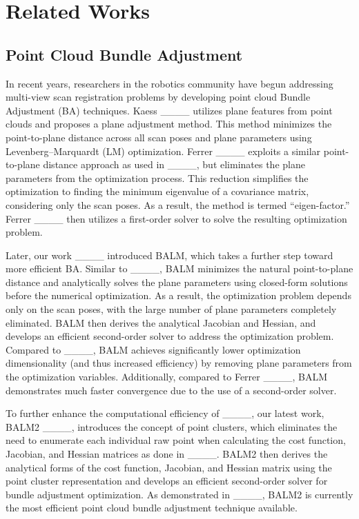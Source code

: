 \section{Related Works}
\label{sec.relatedWorks}

\subsection{Point Cloud Bundle Adjustment}

In recent years, researchers in the robotics community have begun addressing multi-view scan registration problems by developing point cloud Bundle Adjustment (BA) techniques.
Kaess ____ utilizes plane features from point clouds and proposes a plane adjustment method. This method minimizes the point-to-plane distance across all scan poses and plane parameters using Levenberg–Marquardt (LM) optimization.
Ferrer ____ exploits a similar point-to-plane distance approach as used in ____, but eliminates the plane parameters from the optimization process. This reduction simplifies the optimization to finding the minimum eigenvalue of a covariance matrix, considering only the scan poses. As a result, the method is termed ``eigen-factor.'' Ferrer ____ then utilizes a first-order solver to solve the resulting optimization problem.

Later, our work ____ introduced BALM, which takes a further step toward more efficient BA. Similar to ____, BALM minimizes the natural point-to-plane distance and analytically solves the plane parameters using closed-form solutions before the numerical optimization. As a result, the optimization problem depends only on the scan poses, with the large number of plane parameters completely eliminated. BALM then derives the analytical Jacobian and Hessian, and develops an efficient second-order solver to address the optimization problem. Compared to ____, BALM achieves significantly lower optimization dimensionality (and thus increased efficiency) by removing plane parameters from the optimization variables. Additionally, compared to Ferrer ____, BALM demonstrates much faster convergence due to the use of a second-order solver.

To further enhance the computational efficiency of ____, our latest work, BALM2 ____, introduces the concept of point clusters, which eliminates the need to enumerate each individual raw point when calculating the cost function, Jacobian, and Hessian matrices as done in ____. BALM2 then derives the analytical forms of the cost function, Jacobian, and Hessian matrix using the point cluster representation and develops an efficient second-order solver for bundle adjustment optimization. As demonstrated in ____, BALM2 is currently the most efficient point cloud bundle adjustment technique available.

